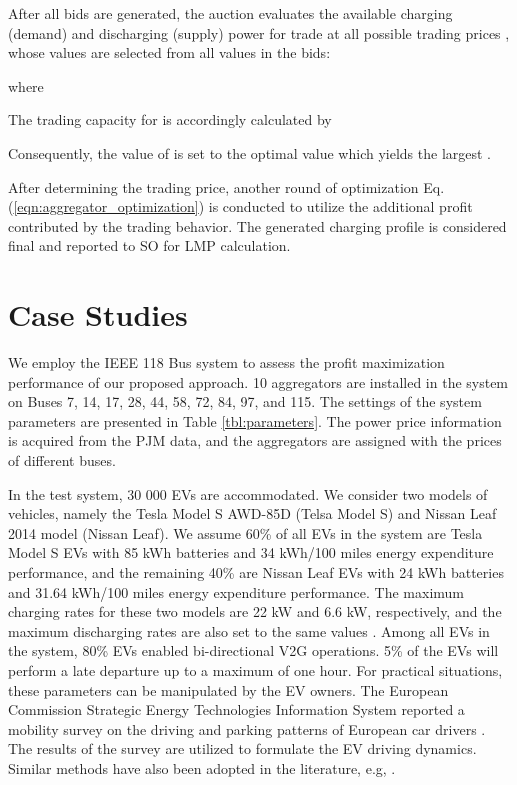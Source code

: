 \documentclass[conference]{IEEEtran}
\begin{document}
	After all bids are generated, the auction evaluates the available charging (demand) and discharging (supply) power for trade at all possible trading prices , whose values are selected from all  values in the bids:
	
	where
	
	The trading capacity for  is accordingly calculated by
	
Consequently, the value of  is set to the optimal  value which yields the largest .
    
After determining the trading price, another round of optimization Eq. (\ref{eqn:aggregator_optimization}) is conducted to utilize the additional profit contributed by the trading behavior. The generated charging profile is considered final and reported to SO for LMP calculation.








	\vspace{-0.1cm}
	\section{Case Studies}
	\vspace{-0.1cm}
	




	We employ the IEEE 118 Bus system \cite{PowerSystemsTestCaseArchive-ref} to assess the profit maximization performance of our proposed approach. 10 aggregators are installed in the system on Buses 7, 14, 17, 28, 44, 58, 72, 84, 97, and 115. The settings of the system parameters are presented in Table \ref{tbl:parameters}. The power price information is acquired from the PJM \cite{PJMEnergyMarketInformation-ref} data, and the aggregators are assigned with the prices of different buses.
	
	In the test system, 30 000 EVs are accommodated. We consider two models of vehicles, namely the Tesla Model S AWD-85D (Telsa Model S) and Nissan Leaf 2014 model (Nissan Leaf). We assume 60\% of all EVs in the system are Tesla Model S EVs with 85 kWh batteries and 34 kWh/100 miles energy expenditure performance, and the remaining 40\% are Nissan Leaf EVs with 24 kWh batteries and 31.64 kWh/100 miles energy expenditure performance. The maximum charging rates for these two models are 22 kW and 6.6 kW, respectively, and the maximum discharging rates are also set to the same values \cite{Nguyen2014}. Among all EVs in the system, 80\% EVs enabled bi-directional V2G operations. 5\% of the EVs will perform a late departure up to a maximum of one hour. For practical situations, these parameters can be manipulated by the EV owners. The European Commission Strategic Energy Technologies Information System reported a mobility survey on the driving and parking patterns of European car drivers \cite{Pasaoglu2012}. The results of the survey are utilized to formulate the EV driving dynamics. Similar methods have also been adopted in the literature, e.g, \cite{Yao2013}.
	
\end{document}
